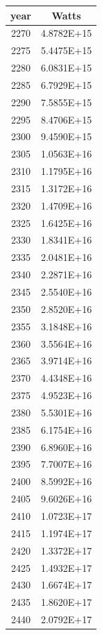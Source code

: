 \documentclass[a4paper]{article}
\begin{document}
	\begin{tabular}{|c|c|}
		\hline
		year & Watts \\
		\hline
		2270 & 4.8782E+15 \\
		\hline
		2275 & 5.4475E+15 \\
		\hline
		2280 & 6.0831E+15 \\
		\hline
		2285 & 6.7929E+15 \\
		\hline
		2290 & 7.5855E+15 \\
		\hline
		2295 & 8.4706E+15 \\
		\hline
		2300 & 9.4590E+15 \\
		\hline
		2305 & 1.0563E+16 \\
		\hline
		2310 & 1.1795E+16 \\
		\hline
		2315 & 1.3172E+16 \\
		\hline
		2320 & 1.4709E+16 \\
		\hline
		2325 & 1.6425E+16 \\
		\hline
		2330 & 1.8341E+16 \\
		\hline
		2335 & 2.0481E+16 \\
		\hline
		2340 & 2.2871E+16 \\
		\hline
		2345 & 2.5540E+16 \\
		\hline
		2350 & 2.8520E+16 \\
		\hline
		2355 & 3.1848E+16 \\
		\hline
		2360 & 3.5564E+16 \\
		\hline
		2365 & 3.9714E+16 \\
		\hline
		2370 & 4.4348E+16 \\
		\hline
		2375 & 4.9523E+16 \\
		\hline
		2380 & 5.5301E+16 \\
		\hline
		2385 & 6.1754E+16 \\
		\hline
		2390 & 6.8960E+16 \\
		\hline
		2395 & 7.7007E+16 \\
		\hline
		2400 & 8.5992E+16 \\
		\hline
		2405 & 9.6026E+16 \\
		\hline
		2410 & 1.0723E+17 \\
		\hline
		2415 & 1.1974E+17 \\
		\hline
		2420 & 1.3372E+17 \\
		\hline
		2425 & 1.4932E+17 \\
		\hline
		2430 & 1.6674E+17 \\
		\hline
		2435 & 1.8620E+17 \\
		\hline
		2440 & 2.0792E+17 \\

\end{tabular}
\end{document}

